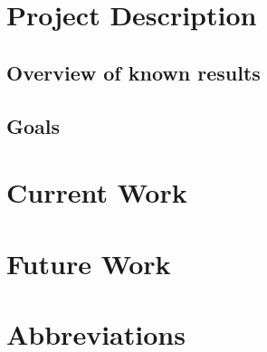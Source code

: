 \documentclass[a4paper]{article}
\begin{document}
\section{Project Description}

\subsection{Overview of known results}

\subsection{Goals}

\section{Current Work}

\section{Future Work}

\section{Abbreviations}
\printglossary[type=\acronymtype]
\printbibliography
\end{document}
